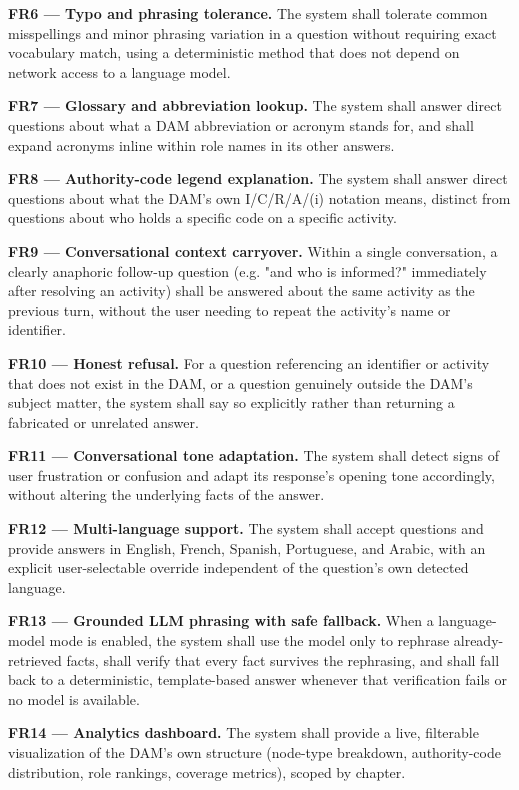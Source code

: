\textbf{FR6 — Typo and phrasing tolerance.} The system shall tolerate common misspellings and minor phrasing variation in a question without requiring exact vocabulary match, using a deterministic method that does not depend on network access to a language model.

\textbf{FR7 — Glossary and abbreviation lookup.} The system shall answer direct questions about what a DAM abbreviation or acronym stands for, and shall expand acronyms inline within role names in its other answers.

\textbf{FR8 — Authority-code legend explanation.} The system shall answer direct questions about what the DAM's own I/C/R/A/(i) notation means, distinct from questions about who holds a specific code on a specific activity.

\textbf{FR9 — Conversational context carryover.} Within a single conversation, a clearly anaphoric follow-up question (e.g. "and who is informed?" immediately after resolving an activity) shall be answered about the same activity as the previous turn, without the user needing to repeat the activity's name or identifier.

\textbf{FR10 — Honest refusal.} For a question referencing an identifier or activity that does not exist in the DAM, or a question genuinely outside the DAM's subject matter, the system shall say so explicitly rather than returning a fabricated or unrelated answer.

\textbf{FR11 — Conversational tone adaptation.} The system shall detect signs of user frustration or confusion and adapt its response's opening tone accordingly, without altering the underlying facts of the answer.

\textbf{FR12 — Multi-language support.} The system shall accept questions and provide answers in English, French, Spanish, Portuguese, and Arabic, with an explicit user-selectable override independent of the question's own detected language.

\textbf{FR13 — Grounded LLM phrasing with safe fallback.} When a language-model mode is enabled, the system shall use the model only to rephrase already-retrieved facts, shall verify that every fact survives the rephrasing, and shall fall back to a deterministic, template-based answer whenever that verification fails or no model is available.

\textbf{FR14 — Analytics dashboard.} The system shall provide a live, filterable visualization of the DAM's own structure (node-type breakdown, authority-code distribution, role rankings, coverage metrics), scoped by chapter.

